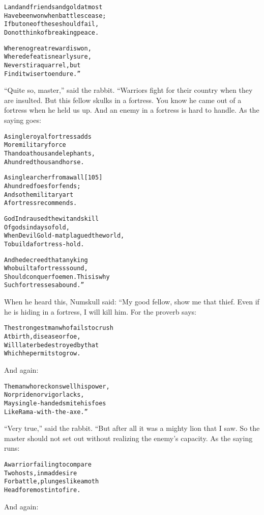 \documentclass{article}
\renewenvironment{verbatim}{\begin{alltt}\normalfont\begin{centering}}{\end{centering}\end{alltt}}
\begin{document}
\begin{verbatim}
Land and friends and gold at most
    Have been won when battles cease;
If but one of these should fail,
    Do not think of breaking peace.

Where no great reward is won,
    Where defeat is nearly sure,
Never stir a quarrel, but
    Find it wiser to endure.”
\end{verbatim}
``Quite so, master,'' said the rabbit. “Warriors fight for their
country when they are insulted. But this fellow skulks in a
fortress. You know he came out of a fortress when he held us up.
And an enemy in a fortress is hard to handle. As the saying goes:

\begin{verbatim}
A single royal fortress adds
    More military force
Than do a thousand elephants,
    A hundred thousand horse.

A single archer from a wall                             [105]
    A hundred foes forfends;
And so the military art
    A fortress recommends.

God Indra used the wit and skill
    Of gods in days of old,
When Devil Gold-mat plagued the world,
    To build a fortress-hold.

And he decreed that any king
    Who built a fortress sound,
Should conquer foemen. This is why
    Such fortresses abound.”
\end{verbatim}
When he heard this, Numskull said: “My good fellow, show me that
thief. Even if he is hiding in a fortress, I will kill him. For the
proverb says:

\begin{verbatim}
The strongest man who fails to crush
    At birth, disease or foe,
Will later be destroyed by that
    Which he permits to grow.
\end{verbatim}
And again:

\begin{verbatim}
The man who reckons well his power,
    Nor pride nor vigor lacks,
May single-handed smite his foes
    Like Rama-with-the-axe.”
\end{verbatim}
``Very true,'' said the rabbit. “But after all it was a mighty lion
that I saw. So the master should not set out without realizing the
enemy's capacity. As the saying runs:

\begin{verbatim}
A warrior failing to compare
    Two hosts, in mad desire
For battle, plunges like a moth
    Headforemost into fire.
\end{verbatim}
And again:
\end{document}
